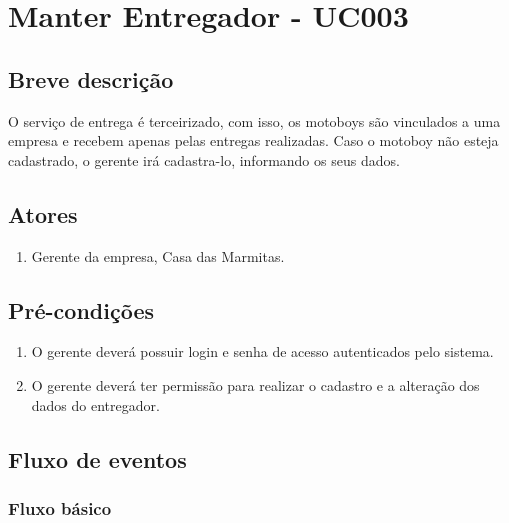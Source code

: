 \chapter{Manter Entregador - UC003} \label{uc003}

\section{Breve descrição}

O serviço de entrega é terceirizado, com isso, os motoboys são vinculados a uma empresa e recebem apenas pelas entregas realizadas. Caso o motoboy não esteja cadastrado, o gerente irá cadastra-lo, informando os seus dados.

\section{Atores}

\begin{enumerate}
	\item Gerente da empresa, Casa das Marmitas.
\end{enumerate}

\section{Pré-condições}

\begin{enumerate}
	\item O gerente deverá possuir login e senha de acesso autenticados pelo sistema.
	\item O gerente deverá ter permissão para realizar o cadastro e a alteração dos dados do entregador.
\end{enumerate}

\section{Fluxo de eventos}

\subsection{Fluxo básico}

